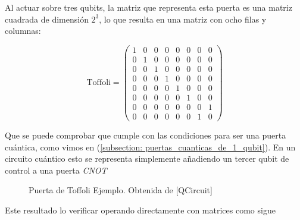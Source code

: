 \documentclass{article}
\numberwithin{equation}{section} %
\begin{document}
    \vspace{2.5mm}

    Al actuar sobre tres qubits, la matriz que representa esta puerta es una matriz cuadrada de dimensión \( 2^{3} \), lo que resulta en una matriz con ocho filas y columnas:

    \begin{equation}
        \text{Toffoli} = \begin{pmatrix}
            1 & 0 & 0 & 0 & 0 & 0 & 0 & 0 \\
            0 & 1 & 0 & 0 & 0 & 0 & 0 & 0 \\
            0 & 0 & 1 & 0 & 0 & 0 & 0 & 0 \\
            0 & 0 & 0 & 1 & 0 & 0 & 0 & 0 \\
            0 & 0 & 0 & 0 & 1 & 0 & 0 & 0 \\
            0 & 0 & 0 & 0 & 0 & 1 & 0 & 0 \\
            0 & 0 & 0 & 0 & 0 & 0 & 0 & 1 \\
            0 & 0 & 0 & 0 & 0 & 0 & 1 & 0 
        \end{pmatrix}
        \label{eq: toffoli_matriz}
    \end{equation}

    \vspace{2.5mm}

    Que se puede comprobar que cumple con las condiciones para ser una puerta cuántica, como vimos en (\ref{subsection: puertas_cuanticas_de_1_qubit}). En un circuito cuántico esto se representa simplemente añadiendo un tercer qubit de control a una puerta \textit{CNOT}

    \vspace{2.5mm}

    \begin{figure}[!h]
        \centering
        \caption{Puerta de Toffoli Ejemplo. Obtenida de [QCircuit]}\label{fig: puerta_toffoli_circuito_clasico}
    \end{figure}

    Este resultado lo verificar operando directamente con matrices como sigue
\end{document}
